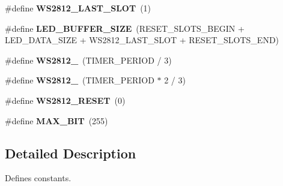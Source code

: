 \begin{DoxyCompactItemize}
\#define {\bfseries W\+S2812\+\_\+\+L\+A\+S\+T\+\_\+\+S\+L\+OT}~(1)
\item 
\mbox{\label{group___constant_ga398165d967d8a2c8ff57ddd0a081a5ff}} 
\#define {\bfseries L\+E\+D\+\_\+\+B\+U\+F\+F\+E\+R\+\_\+\+S\+I\+ZE}~(R\+E\+S\+E\+T\+\_\+\+S\+L\+O\+T\+S\+\_\+\+B\+E\+G\+IN + L\+E\+D\+\_\+\+D\+A\+T\+A\+\_\+\+S\+I\+ZE + W\+S2812\+\_\+\+L\+A\+S\+T\+\_\+\+S\+L\+OT + R\+E\+S\+E\+T\+\_\+\+S\+L\+O\+T\+S\+\_\+\+E\+ND)
\item 
\mbox{\label{group___constant_ga3c67cd1a76ba7e85676da5f023f42430}} 
\#define {\bfseries W\+S2812\+\_}~(T\+I\+M\+E\+R\+\_\+\+P\+E\+R\+I\+OD / 3)
\item 
\mbox{\label{group___constant_gad4cec7bff3f072ffe9ec1e11324c7418}} 
\#define {\bfseries W\+S2812\+\_}~(T\+I\+M\+E\+R\+\_\+\+P\+E\+R\+I\+OD $\ast$ 2 / 3)
\item 
\mbox{\label{group___constant_gaef8a90792d52a7085de6c0affec15557}} 
\#define {\bfseries W\+S2812\+\_\+\+R\+E\+S\+ET}~(0)
\item 
\mbox{\label{group___constant_gaaf645a2813f2274619a70855afb92aca}} 
\#define {\bfseries M\+A\+X\+\_\+B\+IT}~(255)
\end{DoxyCompactItemize}


\subsection{Detailed Description}
Defines constants. 


